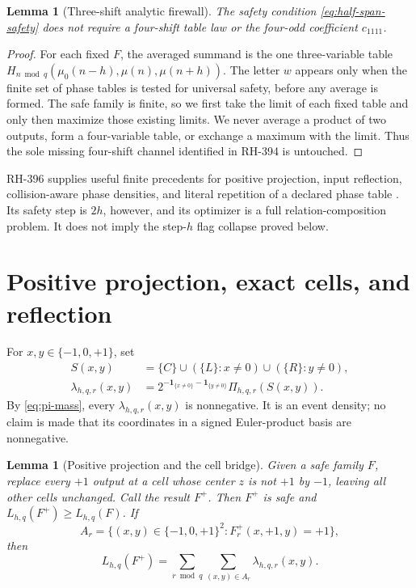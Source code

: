 \documentclass[11pt]{article}
\newtheorem{lemma}[theorem]{Lemma}
\theoremstyle{definition}
\theoremstyle{remark}
\newcommand{\mob}{\mu}
\newcommand{\ind}{\mathbf 1}
\newcommand{\T}{\{-1,0,+1\}}
\begin{document}
\begin{lemma}[Three-shift analytic firewall]
\label{lem:three-shift-firewall}
The safety condition \eqref{eq:half-span-safety} does not require a
four-shift table law or the four-odd coefficient \(c_{1111}\).
\end{lemma}

\begin{proof}
For each fixed \(F\), the averaged summand is the one three-variable table
\(H_{n\bmod q}(\mob_0(n-h),\mob(n),\mob(n+h))\).  The letter \(w\)
appears only when the finite set of phase tables is tested for universal
safety, before any average is formed.  The safe family is finite, so we first
take the limit of each fixed table and only then maximize those existing
limits.  We never average a product of two outputs, form a four-variable
table, or exchange a maximum with the limit.  Thus the sole missing
four-shift channel identified in RH-394 is untouched.
\end{proof}

RH-396 supplies useful finite precedents for positive projection, input
reflection, collision-aware phase densities, and literal repetition of a
declared phase table \cite{RH396}.  Its safety step is \(2h\), however, and
its optimizer is a full relation-composition problem.  It does not imply the
step-\(h\) flag collapse proved below.

\section{Positive projection, exact cells, and reflection}

For \(x,y\in\T\), set
\begin{align}
 S(x,y)&=\{C\}\cup(\{L\}:x\ne0)\cup(\{R\}:y\ne0),
 \label{eq:cell-support}\\
 \lambda_{h,q,r}(x,y)
 &=2^{-\ind_{\{x\ne0\}}-\ind_{\{y\ne0\}}}
 \Pi_{h,q,r}(S(x,y)).
 \label{eq:lambda}
\end{align}
By \eqref{eq:pi-mass}, every \(\lambda_{h,q,r}(x,y)\) is nonnegative.
It is an event density; no claim is made that its coordinates in a signed
Euler-product basis are nonnegative.

\begin{lemma}[Positive projection and the cell bridge]
\label{lem:positive-projection}
Given a safe family \(F\), replace every \(+1\) output at a cell whose
center \(z\) is not \(+1\) by \(-1\), leaving all other cells unchanged.
Call the result \(F^+\).  Then \(F^+\) is safe and
\(L_{h,q}(F^+)\geq L_{h,q}(F)\).  If
\begin{equation}
 A_r=\{(x,y)\in\T^2:F^+_r(x,+1,y)=+1\},
 \label{eq:positive-relation}
\end{equation}
then
\begin{equation}
 L_{h,q}(F^+)=
 \sum_{r\bmod q}\sum_{(x,y)\in A_r}
 \lambda_{h,q,r}(x,y).
 \label{eq:projected-cell-sum}
\end{equation}
\end{lemma}
\end{document}
